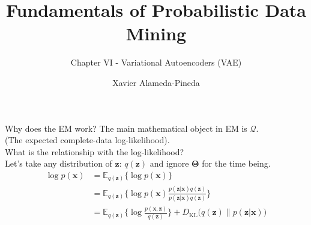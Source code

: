 \documentclass{beamer}
\title[FPDM]{Fundamentals of Probabilistic Data Mining}
\subtitle{Chapter VI - Variational Autoencoders (VAE)} %
\author[Xavi]{Xavier Alameda-Pineda}
\institute{}
\date{}
\newcommand{\bs}[1]{\boldsymbol{#1}}
\begin{document}
\begin{frame}
    \titlepage
    \vspace{-1.9cm}
\end{frame}

% 

\begin{frame}{Why does the EM work?}
 The main mathematical object in EM is $\mathcal{Q}$.\\ {\footnotesize (The expected complete-data log-likelihood).}\vspace{4mm}\\
 
 What is the relationship with the log-likelihood?\\ Let's take any distribution of $\bs{z}$: $q(\bs{z})$ and ignore $\bs{\Theta}$ for the time being.
 \begin{align}
\log p(\bs{x})&= \mathbb{E}_{q(\bs{z})}\Big\{\log p(\bs{x})\Big\}\\
&= \mathbb{E}_{q(\bs{z})}\Big\{\log p(\bs{x})\frac{p(\bs{z}|\bs{x})q(\bs{z})}{p(\bs{z}|\bs{x})q(\bs{z})}\Big\}\\
&= \mathbb{E}_{q(\bs{z})}\Big\{\log \frac{p(\bs{x},\bs{z})}{q(\bs{z})}\Big\} +  D_{\text{KL}}\Big(q(\bs{z})\Big\lVert p(\bs{z}|\bs{x})\Big)
\end{align}
\end{frame}
\end{document}
